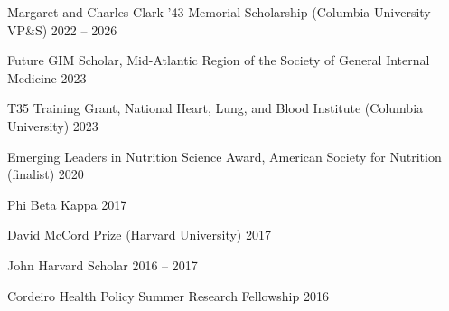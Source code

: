 \documentclass[11pt,article,oneside]{memoir}
\begin{document}
\ind Margaret and Charles Clark '43 Memorial Scholarship (Columbia University VP\&S) \hfill 2022 -- 2026

\ind Future GIM Scholar, Mid-Atlantic Region of the Society of General Internal Medicine \hfill 2023

\ind T35 Training Grant, National Heart, Lung, and Blood Institute (Columbia University) \hfill 2023

\ind Emerging Leaders in Nutrition Science Award, American Society for Nutrition (finalist) \hfill 2020

\ind Phi Beta Kappa \hfill 2017

\ind David McCord Prize (Harvard University) \hfill 2017

\ind John Harvard Scholar \hfill 2016 -- 2017

\ind Cordeiro Health Policy Summer Research Fellowship \hfill 2016

\bigskip
\end{document}
